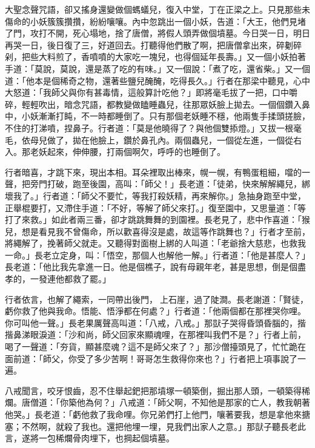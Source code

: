 大聖念聲咒語，卻又搖身還變做個螞蟻兒，復入中堂，丁在正梁之上。只見那些未傷命的小妖簇簇攢攢，紛紛嚷嚷。內中忽跳出一個小妖，告道：「大王，他們見堵了門，攻打不開，死心塌地，捨了唐僧，將假人頭弄做個墳墓。今日哭一日，明日再哭一日，後日復了三，好道回去。打聽得他們散了啊，把唐僧拿出來，碎劖碎剁，把些大料煎了，香噴噴的大家吃一塊兒，也得個延年長壽。」又一個小妖拍著手道：「莫說，莫說，還是蒸了吃的有味。」又一個說：「煮了吃，還省柴。」又一個道：「他本是個稀奇之物，還著些鹽兒醃醃，吃得長久。」行者在那梁中聽見，心中大怒道：「我師父與你有甚毒情，這般算計吃他？」即將毫毛拔了一把，口中嚼碎，輕輕吹出，暗念咒語，都教變做瞌睡蟲兒，往那眾妖臉上拋去。一個個鑽入鼻中，小妖漸漸打盹，不一時都睡倒了。只有那個老妖睡不穩，他兩隻手揉頭搓臉，不住的打涕噴，捏鼻子。行者道：「莫是他曉得了？與他個雙掭燈。」又拔一根毫毛，依母兒做了，拋在他臉上，鑽於鼻孔內。兩個蟲兒，一個從左進，一個從右入。那老妖起來，伸伸腰，打兩個啊欠，呼呼的也睡倒了。

行者暗喜，才跳下來，現出本相。耳朵裡取出棒來，幌一幌，有鴨蛋粗細，噹的一聲，把旁門打破，跑至後園，高叫：「師父！」長老道：「徒弟，快來解解繩兒，綁壞我了。」行者道：「師父不要忙，等我打殺妖精，再來解你。」急抽身跑至中堂，正舉棍要打，又滯住手道：「不好，等解了師父來打。」復至園中，又思量道：「等打了來救。」如此者兩三番，卻才跳跳舞舞的到園裡。長老見了，悲中作喜道：「猴兒，想是看見我不曾傷命，所以歡喜得沒是處，故這等作跳舞也？」行者才至前，將繩解了，挽著師父就走。又聽得對面樹上綁的人叫道：「老爺捨大慈悲，也救我一命。」長老立定身，叫：「悟空，那個人也解他一解。」行者道：「他是甚麼人？」長老道：「他比我先拿進一日。他是個樵子，說有母親年老，甚是思想，倒是個盡孝的，一發連他都救了罷。」

行者依言，也解了繩索，一同帶出後門，𧿼上石崖，過了陡澗。長老謝道：「賢徒，虧你救了他與我命。悟能、悟淨都在何處？」行者道：「他兩個都在那裡哭你哩。你可叫他一聲。」長老果厲聲高叫道：「八戒，八戒。」那獃子哭得昏頭昏腦的，揩揩鼻涕眼淚道：「沙和尚，師父回家來顯魂哩，在那裡叫我們不是？」行者上前，喝了一聲道：「夯貨，顯甚麼魂？這不是師父來了？」那沙僧擡頭見了，忙忙跪在面前道：「師父，你受了多少苦啊！哥哥怎生救得你來也？」行者把上項事說了一遍。

八戒聞言，咬牙恨齒，忍不住舉起鈀把那墳塚一頓築倒，掘出那人頭，一頓築得稀爛。唐僧道：「你築他為何？」八戒道：「師父啊，不知他是那家的亡人，教我朝著他哭。」長老道：「虧他救了我命哩。你兄弟們打上他門，嚷著要我，想是拿他來搪塞；不然啊，就殺了我也。還把他埋一埋，見我們出家人之意。」那獃子聽長老此言，遂將一包稀爛骨肉埋下，也掆起個墳墓。

